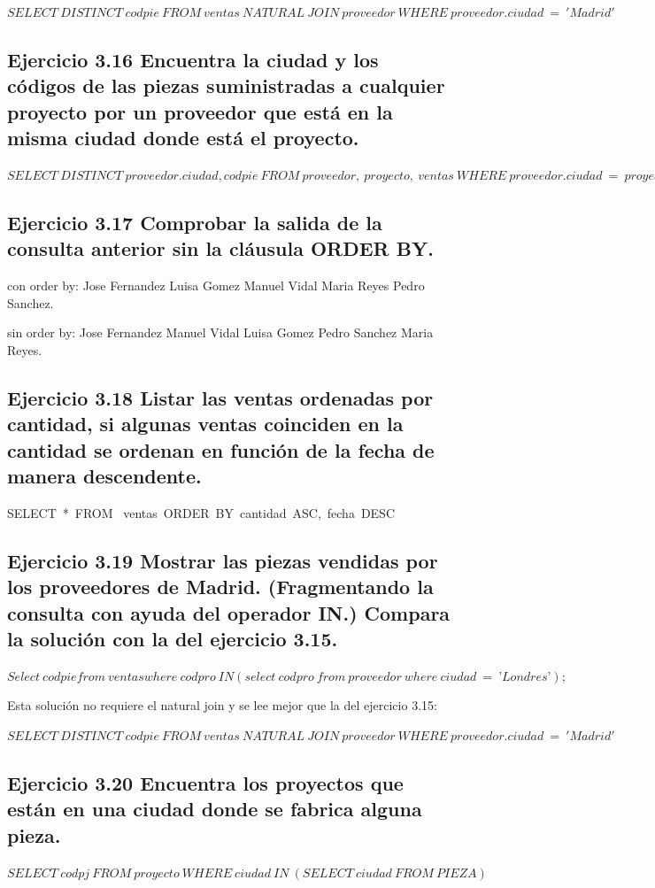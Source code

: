 \documentclass[a4paper, 11pt]{article}
\begin{document}
$SELECT\ DISTINCT\ codpie\ FROM\ ventas\ NATURAL\ JOIN\ proveedor\ WHERE\ proveedor.ciudad\ =\ 'Madrid'$

\subsection{Ejercicio 3.16 Encuentra la ciudad y los códigos de las piezas suministradas a cualquier
	proyecto por un proveedor que está en la misma ciudad donde está el proyecto.}
$
SELECT\ DISTINCT\ proveedor.ciudad,codpie\ FROM\ proveedor,\ proyecto,\ ventas\ WHERE\ proveedor.ciudad\ =\ proyecto.ciudad\ AND\ proveedor.codpro\ =\ ventas.codpro\ AND\ proyecto.codpj\ =\ ventas.codpj$

\subsection{Ejercicio 3.17 Comprobar la salida de la consulta anterior sin la cláusula ORDER BY.}
con order by: Jose Fernandez Luisa Gomez Manuel Vidal Maria Reyes Pedro Sanchez.

sin order by: Jose Fernandez
Manuel Vidal
Luisa Gomez
Pedro Sanchez
Maria Reyes.

\subsection{Ejercicio 3.18 Listar las ventas ordenadas por cantidad, si algunas ventas coinciden en la
	cantidad se ordenan en función de la fecha de manera descendente.}
SELECT\ *\ FROM \ ventas\ ORDER\ BY\ cantidad\ ASC,\ fecha\ DESC\ 


\subsection{Ejercicio 3.19 Mostrar las piezas vendidas por los proveedores de Madrid. (Fragmentando
	la consulta con ayuda del operador IN.) Compara la solución con la del ejercicio 3.15.}

$Select\ codpie
from\ ventas
where\ codpro\ IN
(select\ codpro\ from\ proveedor\ where\ ciudad\ =\ ’Londres’);$ 

Esta solución no requiere el natural join y se lee mejor que la del ejercicio 3.15:

$SELECT\ DISTINCT\ codpie\ FROM\ ventas\ NATURAL\ JOIN\ proveedor\ WHERE\ proveedor.ciudad\ =\ 'Madrid'$


\subsection{Ejercicio 3.20 Encuentra los proyectos que están en una ciudad donde se fabrica alguna
	pieza.}
$SELECT\ codpj\ FROM\ proyecto\ WHERE\ ciudad\ IN\ (SELECT\ ciudad\ FROM\ PIEZA)$
\end{document}

